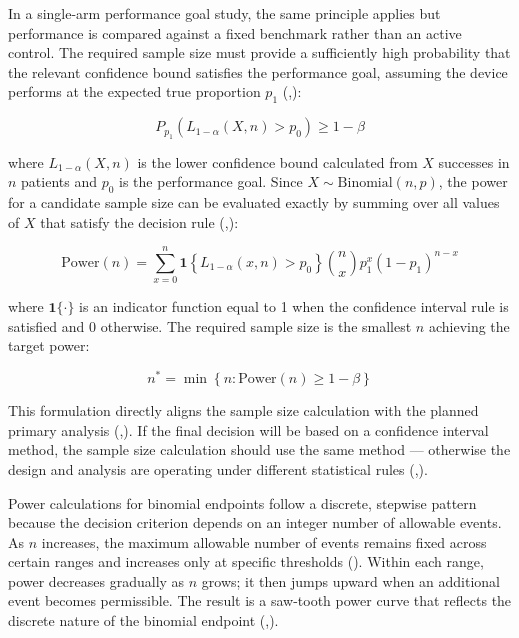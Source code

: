 \documentclass{article}
\begin{document}
In a single-arm performance goal study, the same principle applies but
performance is compared against a fixed benchmark rather than an active
control. The required sample size must provide a sufficiently high
probability that the relevant confidence bound satisfies the performance
goal, assuming the device performs at the expected true proportion
\(p_1\)
(,):

\[P_{p_1}\!\left(L_{1-\alpha}(X, n) > p_0\right) \geq 1 - \beta\]

where \(L_{1-\alpha}(X, n)\) is the lower confidence bound calculated
from \(X\) successes in \(n\) patients and \(p_0\) is the performance
goal. Since \(X \sim \text{Binomial}(n, p)\), the power for a candidate
sample size can be evaluated exactly by summing over all values of \(X\)
that satisfy the decision rule
(,):

\[\text{Power}(n) = \sum_{x=0}^{n} \mathbf{1}\!\left\{L_{1-\alpha}(x,n) > p_0\right\} \binom{n}{x} p_1^x (1-p_1)^{n-x}\]

where \(\mathbf{1}\{\cdot\}\) is an indicator function equal to 1 when
the confidence interval rule is satisfied and 0 otherwise. The required
sample size is the smallest \(n\) achieving the target power:

\[n^* = \min\left\{n : \text{Power}(n) \geq 1 - \beta\right\}\]

This formulation directly aligns the sample size calculation with the
planned primary analysis
(,).
If the final decision will be based on a confidence interval method, the
sample size calculation should use the same method --- otherwise the
design and analysis are operating under different statistical rules
(,).

Power calculations for binomial endpoints follow a discrete, stepwise
pattern because the decision criterion depends on an integer number of
allowable events. As \(n\) increases, the maximum allowable number of
events remains fixed across certain ranges and increases only at
specific thresholds (). Within
each range, power decreases gradually as \(n\) grows; it then jumps
upward when an additional event becomes permissible. The result is a
saw-tooth power curve that reflects the discrete nature of the binomial
endpoint
(,).
\end{document}
